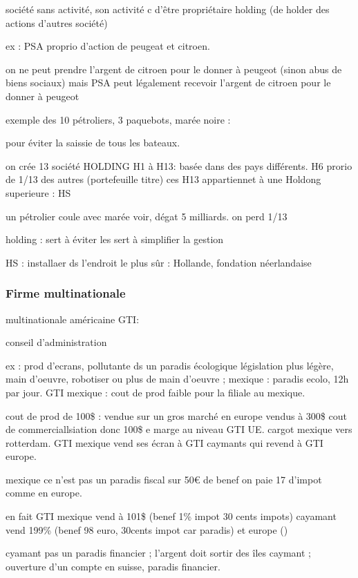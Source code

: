 \documentclass[a4paper,12pt]{article}
\begin{document}
société sans activité, son activité c d'être propriétaire holding (de holder des actions d'autres société)

ex : PSA proprio d'action de peugeat et citroen.

on ne peut prendre l'argent de citroen pour le donner à peugeot (sinon abus de biens sociaux)  mais PSA peut légalement recevoir l'argent de citroen pour le donner à peugeot


exemple des 10 pétroliers, 3 paquebots, marée noire :

pour éviter la saissie  de tous les bateaux.

on crée 13 société HOLDING H1 à H13: basée dans des pays différents.
H6 prorio de 1/13 des autres (portefeuille titre)
ces H13 appartiennet à une Holdong superieure : HS

un pétrolier coule avec marée voir, dégat 5 milliards.
on perd 1/13 

holding : sert à éviter les 
sert à simplifier la gestion

HS : installaer ds l'endroit le plus sûr : Hollande, fondation néerlandaise



\subsubsection { Firme multinationale}

multinationale américaine GTI:

conseil d'administration

ex : prod d'ecrans, pollutante ds un paradis écologique législation plus légère,
main d'oeuvre, robotiser ou plus de main d'oeuvre ; mexique : paradis ecolo, 12h par jour.
GTI mexique : cout de prod faible pour la filiale au mexique.

cout de prod de 100\$ : vendue sur un gros marché en europe vendus à 300\$ cout de commerciallsiation donc 100\$ e marge
au niveau GTI UE. cargot mexique vers rotterdam. GTI mexique vend ses écran à GTI caymants qui revend à GTI europe.

mexique ce n'est pas un paradis fiscal sur 50€ de benef on paie 17 d'impot comme en europe.

en fait GTI mexique vend à 101\$ (benef 1\% impot 30 cents impots)  cayamant vend 199\% (benef 98 euro, 30cents impot car paradis) et europe ()


cyamant pas un paradis financier ; l'argent doit sortir des îles caymant ; ouverture d'un compte en suisse, paradis financier.  
\end{document}
